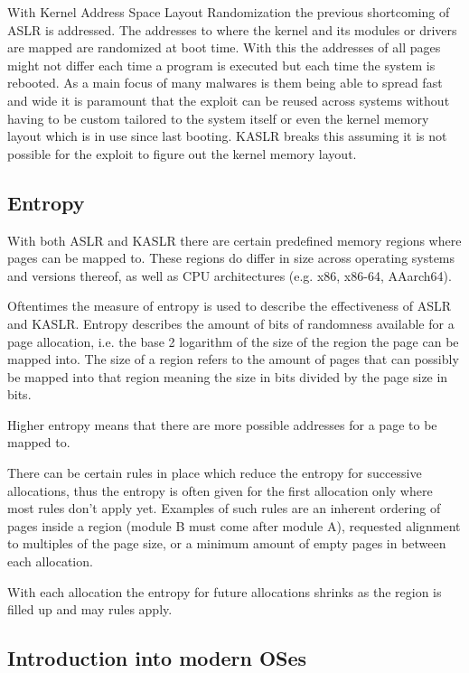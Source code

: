 With Kernel Address Space Layout Randomization the previous shortcoming of ASLR is addressed.
The addresses to where the kernel and its modules or drivers are mapped are randomized at boot time.
With this the addresses of all pages might not differ each time a program is executed but each time the system is rebooted.
As a main focus of many malwares is them being able to spread fast and wide it is paramount that the exploit can be reused across systems without having to be custom tailored to the system itself or even the kernel memory layout which is in use since last booting.
KASLR breaks this assuming it is not possible for the exploit to figure out the kernel memory layout.

\subsection{Entropy}

With both ASLR and KASLR there are certain predefined memory regions where pages can be mapped to.
These regions do differ in size across operating systems and versions thereof, as well as CPU architectures (e.g. x86, x86-64, AAarch64).

Oftentimes the measure of entropy is used to describe the effectiveness of ASLR and KASLR.
Entropy describes the amount of bits of randomness available for a page allocation, i.e. the base 2 logarithm of the size of the region the page can be mapped into.
The size of a region refers to the amount of pages that can possibly be mapped into that region meaning the size in bits divided by the page size in bits.

Higher entropy means that there are more possible addresses for a page to be mapped to.

There can be certain rules in place which reduce the entropy for successive allocations,  thus the entropy is often given for the first allocation only where most rules don't apply yet.
Examples of such rules are an inherent ordering of pages inside a region (module B must come after module A), requested alignment to multiples of the page size, or a minimum amount of empty pages in between each allocation.

With each allocation the entropy for future allocations shrinks as the region is filled up and may rules apply.

\subsection{Introduction into modern OSes}

